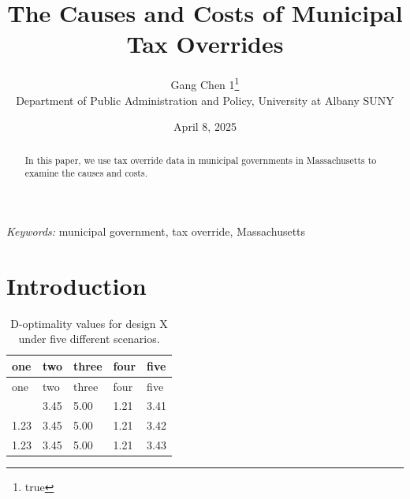 \documentclass[
  12pt]{article}
\begin{document}
\def\spacingset#1{\renewcommand{\baselinestretch}%
{#1}\small\normalsize} \spacingset{1}



\date{April 8, 2025}
\title{\bf The Causes and Costs of Municipal Tax Overrides}
\author{
Gang Chen 1\thanks{true}\\
Department of Public Administration and Policy, University at Albany
SUNY\\
}
\maketitle

\bigskip
\bigskip
\begin{abstract}
In this paper, we use tax override data in municipal governments in
Massachusetts to examine the causes and costs.
\end{abstract}

\noindent%
{\it Keywords:} municipal government, tax override, Massachusetts
\vfill

\newpage
\spacingset{1.9} %


\section{Introduction}\label{sec-intro}

\begin{longtable}[]{@{}lllll@{}}
\caption{D-optimality values for design X under five different
scenarios.}\label{tbl-one}\tabularnewline
\toprule\noalign{}
one & two & three & four & five \\
\midrule\noalign{}
\endfirsthead
\toprule\noalign{}
one & two & three & four & five \\
\midrule\noalign{}
\endhead
\bottomrule\noalign{}
\endlastfoot
1.23 & 3.45 & 5.00 & 1.21 & 3.41 \\
1.23 & 3.45 & 5.00 & 1.21 & 3.42 \\
1.23 & 3.45 & 5.00 & 1.21 & 3.43 \\
\end{longtable}
\end{document}
